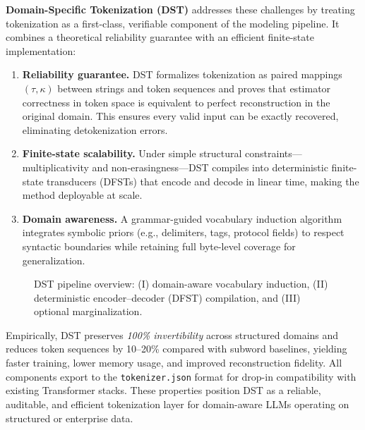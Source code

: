 \textbf{Domain-Specific Tokenization (DST)} addresses these challenges by treating tokenization as a first-class, verifiable component of the modeling pipeline.
It combines a theoretical reliability guarantee with an efficient finite-state implementation:

\begin{enumerate}
    \item \textbf{Reliability guarantee.}
    DST formalizes tokenization as paired mappings $(\tau,\kappa)$ between strings and token sequences and proves that estimator correctness in token space is equivalent to perfect reconstruction in the original domain.
    This ensures every valid input can be exactly recovered, eliminating detokenization errors.
    \item \textbf{Finite-state scalability.}
    Under simple structural constraints---multiplicativity and non-erasingness---DST compiles into deterministic finite-state transducers (DFSTs) that encode and decode in linear time, making the method deployable at scale.
    \item \textbf{Domain awareness.}
    A grammar-guided vocabulary induction algorithm integrates symbolic priors (e.g., delimiters, tags, protocol fields) to respect syntactic boundaries while retaining full byte-level coverage for generalization.
\end{enumerate}

\begin{figure}[t]
  \centering
  \setlength{\fboxsep}{0pt}\fbox{\rule{0pt}{120pt}\rule{240pt}{0pt}}
  \caption{DST pipeline overview: (I) domain-aware vocabulary induction, (II) deterministic encoder–decoder (DFST) compilation, and (III) optional marginalization.}
  \label{fig:dst_pipeline}
\end{figure}

Empirically, DST preserves \emph{100\% invertibility} across structured domains and reduces token sequences by 10--20\% compared with subword baselines, yielding faster training, lower memory usage, and improved reconstruction fidelity.
All components export to the \texttt{tokenizer.json} format for drop-in compatibility with existing Transformer stacks.
These properties position DST as a reliable, auditable, and efficient tokenization layer for domain-aware LLMs operating on structured or enterprise data.

